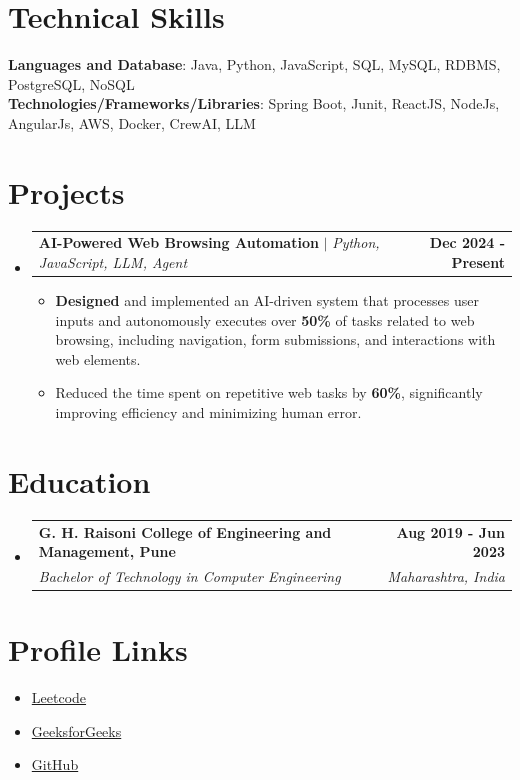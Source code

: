 \documentclass[letterpaper,11pt]{article}
\makeatletter
\newcommand{\resumeItem}[1]{
  \item\small{
	{#1 \vspace{-2pt}}
  }
}
\newcommand{\resumeSubheading}[4]{
  \vspace{-2pt}\item
	\begin{tabular*}{1.0\textwidth}[t]{l@{\extracolsep{\fill}}r}
  	\textbf{#1} & \textbf{\small #2} \\
  	\textit{\small#3} & \textit{\small #4} \\
	\end{tabular*}\vspace{-7pt}
}
\newcommand{\resumeProjectHeading}[2]{
	\item
	\begin{tabular*}{1.001\textwidth}{l@{\extracolsep{\fill}}r}
  	\small#1 & \textbf{\small #2}\\
	\end{tabular*}\vspace{-7pt}
}
\newcommand{\resumeSubHeadingListStart}{\begin{itemize}[leftmargin=0.0in, label={}]}
\newcommand{\resumeSubHeadingListEnd}{\end{itemize}}
\newcommand{\resumeItemListStart}{\begin{itemize}}
\newcommand{\resumeItemListEnd}{\end{itemize}\vspace{-5pt}}
\makeatother
\begin{document}
\section{Technical Skills}
 \begin{itemize}[leftmargin=0.15in, label={}]
	\small{\item{
 	\textbf{Languages and Database}{: Java, Python, JavaScript, SQL, MySQL, RDBMS, PostgreSQL, NoSQL} \\
 	\textbf{Technologies/Frameworks/Libraries}{: Spring Boot, Junit, ReactJS, NodeJs, AngularJs, AWS, Docker, CrewAI, LLM}
	}}
 \end{itemize}
 \vspace{-16pt}

\section{Projects}
	\vspace{-5pt}
	\resumeSubHeadingListStart
	\resumeProjectHeading
      	{\textbf{AI-Powered Web Browsing Automation} $|$ \emph{Python, JavaScript, LLM, Agent}}{Dec 2024 - Present}
      	\resumeItemListStart
        	\resumeItem{\textbf{Designed} and implemented an AI-driven system that processes user inputs and autonomously executes over \textbf{50\%} of tasks related to web browsing, including navigation, form submissions, and interactions with web elements.}
        	\resumeItem{Reduced the time spent on repetitive web tasks by \textbf{60\%}, significantly improving efficiency and minimizing human error.}
      	\resumeItemListEnd
	\resumeSubHeadingListEnd
\vspace{-15pt}

\section{Education}
  \resumeSubHeadingListStart
	\resumeSubheading
  	{G. H. Raisoni College of Engineering and Management, Pune}{Aug 2019 - Jun 2023}
  	{Bachelor of Technology in Computer Engineering}{Maharashtra, India}
  \resumeSubHeadingListEnd

\section{Profile Links}
 \begin{itemize}[leftmargin=0.15in, label={}]
        \resumeItem{\href{https://leetcode.com/u/rg-incognito/}{Leetcode}}
        \resumeItem{\href{https://www.geeksforgeeks.org/user/rohitrohit0705/}{GeeksforGeeks}}
    	\resumeItem{\href{https://github.com/rg-incognito/}{GitHub}}
 \end{itemize}
 \vspace{-16pt}
\end{document}
